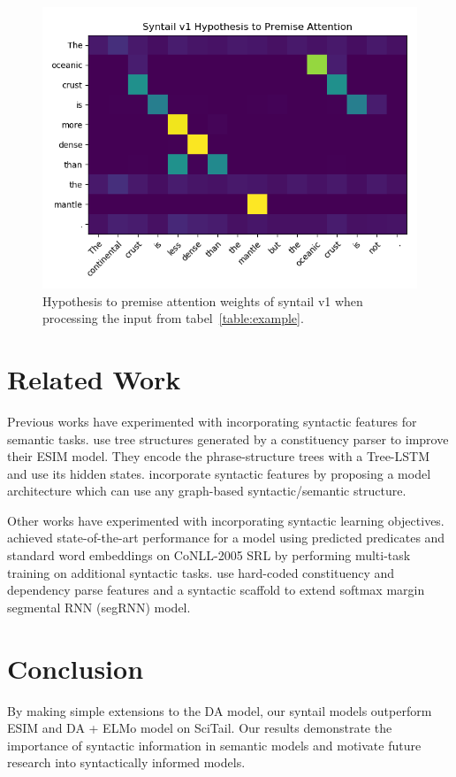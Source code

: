 \documentclass[11pt,a4paper]{article}
\begin{document}
\begin{figure}[h]
    \centering
    \includegraphics[width=\linewidth]{figures/syntail-h2p-attention.png}
    \caption{Hypothesis to premise attention weights of syntail v1 when processing
             the input from tabel~\ref{table:example}.}
    \label{fig:sytail-attention-weights}
\end{figure}

\section{Related Work}

Previous works have experimented with incorporating syntactic features for semantic tasks.
\citet{Chen2016-wl} use tree structures generated by a constituency parser to improve
their ESIM model. They encode the phrase-structure trees with a Tree-LSTM and use its
hidden states. \citet{Khot2018-th} incorporate syntactic features by
proposing a model architecture which can use any graph-based syntactic/semantic structure.

Other works have experimented with incorporating syntactic learning objectives.
\citet{Strubell2018-qw} achieved state-of-the-art performance
for a model using predicted predicates and standard word embeddings on
CoNLL-2005 SRL by performing multi-task training on additional syntactic tasks.
\citet{Swayamdipta2017-ct} use hard-coded constituency and dependency parse features
and a syntactic scaffold to
extend softmax margin segmental RNN (segRNN) model.

\section{Conclusion}

By making simple extensions to the DA model,
our syntail models outperform ESIM and DA + ELMo model on SciTail.
Our results demonstrate the importance of syntactic information in semantic models
and motivate future research into syntactically informed models.



\end{document}
